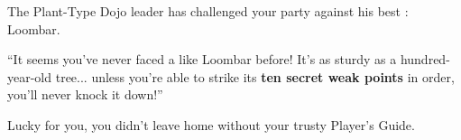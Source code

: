 

The Plant-Type Dojo leader has challenged your party against his
best \mappMobimon{}: Loombar.

``It seems you've never faced a \mappMobimon{} like Loombar before!
It's as sturdy as a hundred-year-old tree... unless you're able to
strike its \textbf{ten secret weak points} in order,
you'll never knock it down!''

Lucky for you, you didn't leave home without your trusty Player's Guide.



